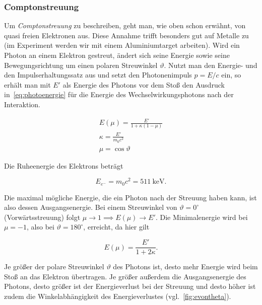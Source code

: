 \documentclass[slug=CS, room=Andreas-Schubert-Bau\,\ Labor\ 406,
supervisor=Juliane\ Volkmer, coursedate=29.\ 11.\ 2019]{../../Lab_Report_LaTeX/lab_report}
\newcommand{\cs}{\emph{Comptonstreuung}}
\begin{document}
\subsubsection{Comptonstreuung}
\label{sec:cs}

Um \cs{} zu beschreiben, geht man, wie oben schon erwähnt, von quasi
freien Elektronen aus.  Diese Annahme trifft besonders gut auf Metalle
zu (im Experiment werden wir mit einem Aluminiumtarget arbeiten).
Wird ein Photon an einem Elektron gestreut, ändert sich seine Energie
sowie seine Bewegungsrichtung um einen polaren Streuwinkel
\(\vartheta\). Nutzt man den Energie- und den Impulserhaltungssatz aus
und setzt den Photonenimpuls \(p = E/c\) ein, so erhält man mit \(E'\)
als Energie des Photons vor dem Sto\ss{} den Ausdruck
in~\eqref{eq:photoenergie} für die Energie des Wechselwirkungsphotons
nach der Interaktion.

\begin{gather}
        E(\mu) = \frac{E'}{1 + \kappa(1 - \mu)} \label{eq:photoenergie}\\
        \kappa = \frac{E'}{m_0c^2}\\
        \mu = \cos\vartheta
\end{gather}

Die Ruheenergie des Elektrons beträgt

\begin{equation}\label{key}
        E_{e^-} = m_0c^2 = \SI{511}{\kilo\electronvolt}.
\end{equation}

Die maximal mögliche Energie, die ein Photon nach der Streuung haben kann, ist also dessen
Ausgangsenergie. Bei einem Streuwinkel von \(\vartheta = 0^\circ\) (Vorwärtsstreuung) folgt
\(\mu \rightarrow 1 \implies E(\mu) \rightarrow E'\).
Die Minimalenergie wird bei \(\mu = -1\), also bei \(\vartheta = 180^\circ\), erreicht, da
hier gilt

\begin{equation}\label{eq:emax}
        E(\mu) = \frac{E'}{1 + 2\kappa}.
\end{equation}

Je größer der polare Streuwinkel \(\vartheta\) des Photons ist, desto mehr Energie wird beim Stoß
an das Elektron übertragen. Je größer außerdem die Ausgangsenergie des Photons, desto größer ist
der Energieverlust bei der Streuung und desto höher ist zudem die Winkelabhängigkeit des
Energieverlustes (vgl.~\ref{fig:evontheta}).\\
\end{document}
